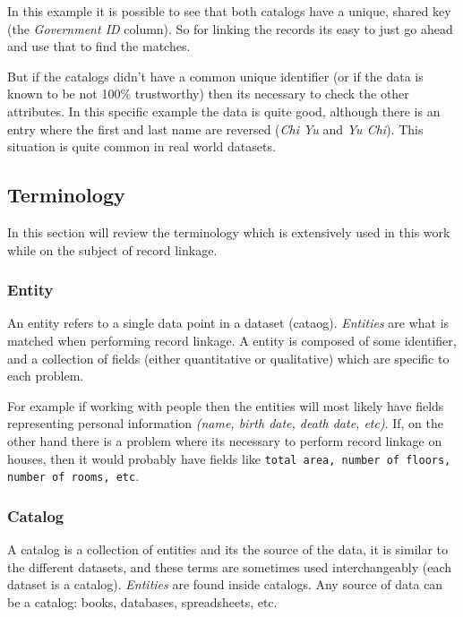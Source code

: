 \documentclass[epsfig,a4paper,11pt,titlepage,twoside,openany]{book}
\begin{document}
In this example it is possible to see that both catalogs have a unique, shared key (the
\textit{Government ID} column). So for linking the records its easy to just go ahead
and use that to find the matches.

But if the catalogs didn't have a common unique identifier (or if the
data is known to be not 100\% trustworthy) then its necessary to check the other attributes. In
this specific example the data is quite good, although there is an entry where
the first and last name are reversed (\textit{Chi Yu} and \textit{Yu Chi}). This
situation is quite common in real world datasets.

\subsection{Terminology}
\label{sec:rl-terminology}

In this section will review the terminology which is extensively used in this work while on the subject of record linkage.

\subsubsection{Entity}
\label{sec:rl-term-entity}

An entity refers to a single data point in a dataset (cataog). \textit{Entities} are what is matched when performing record linkage. A entity is composed of some identifier, and a collection of fields (either quantitative or qualitative) which are specific to each problem. 
  
For example if working with people then the entities will most likely have fields representing personal information \textit{(name, birth date, death date, etc)}. If, on the other hand there is a problem where its necessary to perform record linkage on houses, then it would probably have fields like \texttt{total area, number of floors, number of rooms, etc}.


\subsubsection{Catalog}
\label{sec:rl-term-catalog}

A catalog is a collection of entities and its the source of the data, it is similar to the different datasets, and these terms are sometimes used interchangeably (each dataset is a catalog). \textit{Entities} are found inside catalogs. 
Any source of data can be a catalog: books, databases, spreadsheets, etc.
\end{document}
